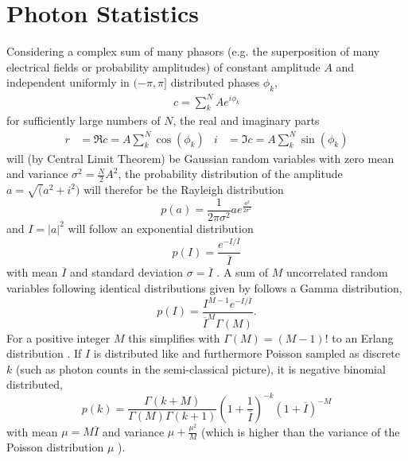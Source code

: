 \section{Photon Statistics}
Considering a complex sum of many phasors (e.g. the superposition of many electrical fields or probability amplitudes) of constant amplitude $A$ and independent uniformly in $(-\pi,\pi]$ distributed phases $\phi_k$,
\begin{align}
	c=\sum^N_k A e^{i\phi_k}
\end{align}
for sufficiently large numbers of $N$, the real and imaginary parts
\begin{align*}
	r&=\Re c =  A \sum^N_k \cos(\phi_k) &
	i&= \Im c =A \sum^N_k \sin(\phi_k)
\end{align*}
will (by Central Limit Theorem) be Gaussian random variables with zero mean and variance $\sigma^2=\frac{N}{2}A^2$, the probability distribution of the amplitude $a=\sqrt(a^2+i^2)$ will therefor be the Rayleigh distribution
\begin{equation}
	p(a)=\frac{1}{2\pi\sigma^2} a e^{\frac{a^2}{2\sigma^2}}
\end{equation}
and  $I=\left|a\right|^2$ will  follow an exponential distribution
\begin{equation}
	\label{eq:expdistr}
	p(I)=\frac{ e^{-I/\overline{I}}}{\overline{I}}
\end{equation} 
with mean $\overline{I}$ and standard deviation $\sigma=\overline{I}$  \cite{goodman2000,goodman1976}.
A sum of $M$ uncorrelated random variables following identical distributions given by  follows a Gamma distribution,
\begin{equation}
	\label{eq:gammadistr}
	p(I)=\frac{I^{M-1} e^{-I/\overline{I}}} {\overline{I}^M \Gamma(M)}.
\end{equation}
For a positive integer $M$ this simplifies with $\Gamma(M)=(M-1)!$ to an Erlang distribution  \cite{forbes2010,trost2020}.
If $I$ is distributed like  and furthermore Poisson sampled as discrete $k$ (such as photon counts in the semi-classical picture), it is negative binomial distributed,
\cite{trost2020,mandel1959,holmes2019}
\begin{equation}
	p(k)=
	\frac{\Gamma(k+M)}{\Gamma(M)\Gamma(k+1) }
	\left( 1+\frac{1}{\overline{I}}
	\right)^{-k}
	\left( 1+\overline{I}
	\right)^{-M}
	\label{eq:negbinomialdist}
\end{equation}
with mean $\mu=M\overline{I}$ and variance $\mu+\frac{\mu^2}{M}$ (which is higher than the variance of the Poisson distribution $\mu$ ).

